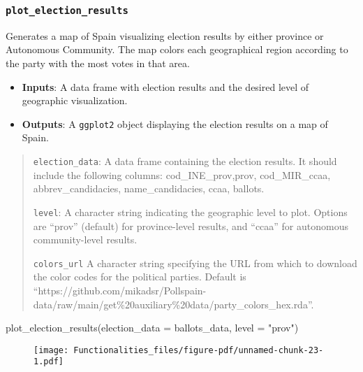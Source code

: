 \documentclass[
  letterpaper,
  DIV=11,
  numbers=noendperiod]{scrreprt}
\newenvironment{Shaded}{\begin{snugshade}}{\end{snugshade}}
\newcommand{\AttributeTok}[1]{\textcolor[rgb]{0.40,0.45,0.13}{#1}}
\newcommand{\FunctionTok}[1]{\textcolor[rgb]{0.28,0.35,0.67}{#1}}
\newcommand{\NormalTok}[1]{\textcolor[rgb]{0.00,0.23,0.31}{#1}}
\newcommand{\StringTok}[1]{\textcolor[rgb]{0.13,0.47,0.30}{#1}}
\providecommand{\tightlist}{%
  \setlength{\itemsep}{0pt}\setlength{\parskip}{0pt}}\usepackage{longtable,booktabs,array}
\begin{document}
\hypertarget{plot_election_results}{%
\subsubsection{\texorpdfstring{\texttt{plot\_election\_results}}{plot\_election\_results}}\label{plot_election_results}}

Generates a map of Spain visualizing election results by either province
or Autonomous Community. The map colors each geographical region
according to the party with the most votes in that area.

\begin{itemize}
\tightlist
\item
  \textbf{Inputs}: A data frame with election results and the desired
  level of geographic visualization.
\item
  \textbf{Outputs}: A \texttt{ggplot2} object displaying the election
  results on a map of Spain.
\end{itemize}

\begin{quote}
\texttt{election\_data}: A data frame containing the election results.
It should include the following columns: cod\_INE\_prov,prov,
cod\_MIR\_ccaa, abbrev\_candidacies, name\_candidacies, ccaa, ballots.

\texttt{level}: A character string indicating the geographic level to
plot. Options are ``prov'' (default) for province-level results, and
``ccaa'' for autonomous community-level results.

\texttt{colors\_url} A character string specifying the URL from which to
download the color codes for the political parties. Default is
``https://github.com/mikadsr/Pollspain-data/raw/main/get\%20auxiliary\%20data/party\_colors\_hex.rda''.
\end{quote}

\begin{Shaded}
\begin{Highlighting}[]
\FunctionTok{plot\_election\_results}\NormalTok{(}\AttributeTok{election\_data =}\NormalTok{ ballots\_data, }\AttributeTok{level =} \StringTok{"prov"}\NormalTok{)}
\end{Highlighting}
\end{Shaded}

\begin{figure}[H]

{\centering \texttt{[image: Functionalities\_files/figure-pdf/unnamed-chunk-23-1.pdf]}

}

\end{figure}
\end{document}
